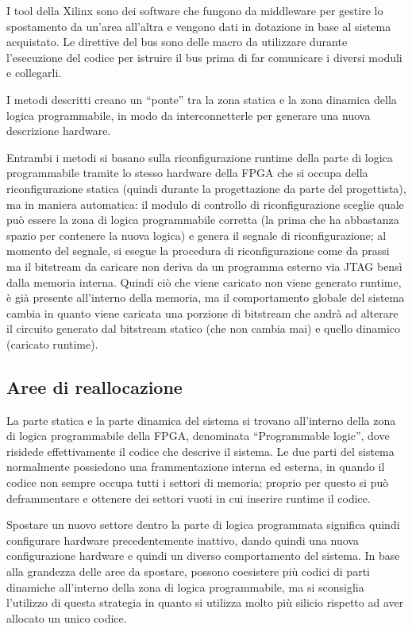 \documentclass[a4paper,titlepage]{book}
\begin{document}
I tool della Xilinx sono dei software che fungono da middleware per gestire lo spostamento da un'area all'altra e vengono dati in dotazione in base al sistema acquistato. Le direttive del bus sono delle macro da utilizzare durante l'esecuzione del codice per istruire il bus prima di far comunicare i diversi moduli e collegarli. 

I metodi descritti creano un ``ponte'' tra la zona statica e la zona dinamica della logica programmabile, in modo da interconnetterle per generare una nuova descrizione hardware.

Entrambi i metodi si basano sulla riconfigurazione runtime della parte di logica programmabile tramite lo stesso hardware della FPGA che si occupa della riconfigurazione statica (quindi durante la progettazione da parte del progettista), ma in maniera automatica: il modulo di controllo di riconfigurazione sceglie quale può essere la zona di logica programmabile corretta (la prima che ha abbastanza spazio per contenere la nuova logica) e genera il segnale di riconfigurazione; al momento del segnale, si esegue la procedura di riconfigurazione come da prassi ma il bitstream da caricare non deriva da un programma esterno via JTAG bensì dalla memoria interna. Quindi ciò che viene caricato non viene generato runtime, è già presente all'interno della memoria, ma il comportamento globale del sistema cambia in quanto viene caricata una porzione di bitstream che andrà ad alterare il circuito generato dal bitstream statico (che non cambia mai) e quello dinamico (caricato runtime).

\subsection{Aree di reallocazione}

La parte statica e la parte dinamica del sistema si trovano all'interno della zona di logica programmabile della FPGA, denominata ``Programmable logic'', dove risidede effettivamente il codice che descrive il sistema. Le due parti del sistema normalmente possiedono una frammentazione interna ed esterna, in quando il codice non sempre occupa tutti i settori di memoria; proprio per questo si può deframmentare e ottenere dei settori vuoti in cui inserire runtime il codice.

Spostare un nuovo settore dentro la parte di logica programmata significa quindi configurare hardware precedentemente inattivo, dando quindi una nuova configurazione hardware e quindi un diverso comportamento del sistema. In base alla grandezza delle aree da spostare, possono coesistere più codici di parti dinamiche all'interno della zona di logica programmabile, ma si sconsiglia l'utilizzo di questa strategia in quanto si utilizza molto più silicio rispetto ad aver allocato un unico codice.
\end{document}
